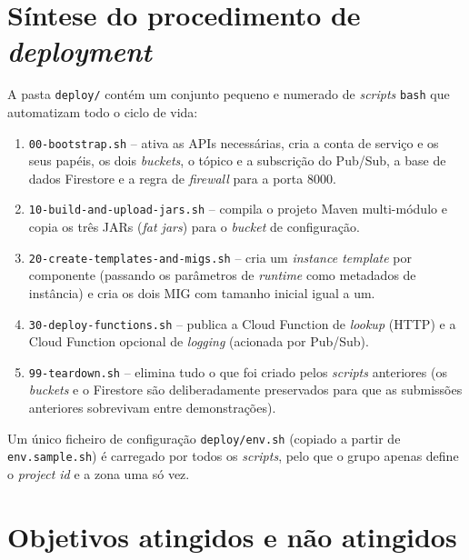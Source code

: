 \documentclass[11pt,a4paper]{article}
\begin{document}
\section{S\'intese do procedimento de \emph{deployment}}
\label{sec:deploy}

A pasta \texttt{deploy/} cont\'em um conjunto pequeno e numerado de
\emph{scripts} \texttt{bash} que automatizam todo o ciclo de vida:

\begin{enumerate}[leftmargin=1.4em,itemsep=2pt]
  \item \texttt{00-bootstrap.sh} -- ativa as APIs necess\'arias, cria a
        conta de servi\c{c}o e os seus pap\'eis, os dois \emph{buckets}, o
        t\'opico e a subscri\c{c}\~ao do Pub/Sub, a base de dados Firestore
        e a regra de \emph{firewall} para a porta 8000.
  \item \texttt{10-build-and-upload-jars.sh} -- compila o projeto Maven
        multi-m\'odulo e copia os tr\^es JARs (\emph{fat jars}) para o
        \emph{bucket} de configura\c{c}\~ao.
  \item \texttt{20-create-templates-and-migs.sh} -- cria um
        \emph{instance template} por componente (passando os par\^ametros
        de \emph{runtime} como metadados de inst\^ancia) e cria os dois
        MIG com tamanho inicial igual a um.
  \item \texttt{30-deploy-functions.sh} -- publica a Cloud Function de
        \emph{lookup} (HTTP) e a Cloud Function opcional de
        \emph{logging} (acionada por Pub/Sub).
  \item \texttt{99-teardown.sh} -- elimina tudo o que foi criado pelos
        \emph{scripts} anteriores (os \emph{buckets} e o Firestore s\~ao
        deliberadamente preservados para que as submiss\~oes anteriores
        sobrevivam entre demonstra\c{c}\~oes).
\end{enumerate}

Um \'unico ficheiro de configura\c{c}\~ao \texttt{deploy/env.sh} (copiado a
partir de \texttt{env.sample.sh}) \'e carregado por todos os
\emph{scripts}, pelo que o grupo apenas define o \emph{project id} e a
zona uma s\'o vez.

\section{Objetivos atingidos e n\~ao atingidos}
\label{sec:resultados}
\end{document}
